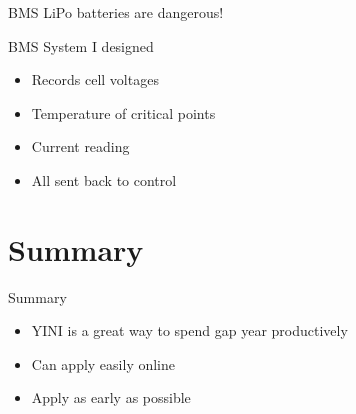 \documentclass{beamer}
\begin{document}
\begin{frame}{BMS}
	LiPo batteries are dangerous!
	\centering
\end{frame}

\begin{frame}{BMS}
	System I designed
	\begin{itemize}
		\item
			Records cell voltages
		\item
			Temperature of critical points
		\item 
			Current reading
		\item 
			All sent back to control
	\end{itemize}
\end{frame}

\section*{Summary}

\begin{frame}{Summary}

  \begin{itemize}
  \item
	  \alert{YINI} is a great way to spend gap year productively
  \item
	  Can apply easily online
  \item
	  Apply as early as possible
  \end{itemize}
\end{frame}
\end{document}
